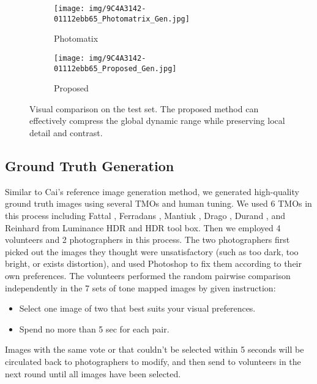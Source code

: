 \documentclass[journal]{IEEEtran}
\begin{document}
\begin{figure*}[t]
        \begin{subfigure}[b]{0.245\textwidth}   
            \centering 
            \texttt{[image: img/9C4A3142-01112ebb65\_Photomatrix\_Gen.jpg]}
            \caption[]%
            {{\small Photomatix \cite{photomatrix} }}    
            \label{fig:mean and std of net34}
        \end{subfigure}
        \begin{subfigure}[b]{0.245\textwidth}   
            \centering 
            \texttt{[image: img/9C4A3142-01112ebb65\_Proposed\_Gen.jpg]}
            \caption[]%
            {{\small Proposed  }}    
            \label{fig:mean and std of net44}
        \end{subfigure}
        \caption{Visual comparison on the test set. The proposed method can effectively compress the global dynamic range while preserving local detail and contrast.}
        \label{fig:laval_global_compress}
\end{figure*}


\subsection{Ground Truth Generation}
Similar to  Cai’s \cite{Cai2018deep} reference image generation method, we generated high-quality ground truth images using several TMOs and human tuning. We used 6 TMOs in this process including Fattal \cite{fattal2002gradient}, Ferradans \cite{ferradans2011analysis}, Mantiuk \cite{mantiuk2008display}, Drago \cite{drago2003adaptive}, Durand \cite{durand2002fast}, and Reinhard \cite{reinhard2010high} from Luminance HDR and HDR tool box.  Then we employed 4 volunteers and 2 photographers in this process. The two photographers first picked out the images they thought were unsatisfactory (such as too dark, too bright, or exists distortion), and used Photoshop to fix them according to their own preferences. The volunteers performed the random pairwise comparison independently in the 7 sets of tone mapped images by given instruction:

\begin{itemize}
  \item Select one image of two that best suits your visual preferences.
  \item Spend no more than 5 sec for each pair.
\end{itemize}

Images with the same vote or that couldn't be selected within 5 seconds will be circulated back to photographers to modify, and then send to volunteers in the next round until all images have been selected.
\end{document}
